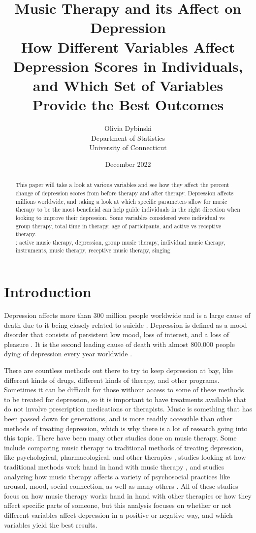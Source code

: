 \documentclass[12pt, titlepage]{article}
\title{Music Therapy and its Affect on Depression \\[1ex] \large How Different Variables Affect Depression Scores in Individuals, and Which Set of Variables Provide the Best Outcomes}
\author{Olivia Dybinski\\
  Department of Statistics\\
  University of Connecticut}
\date{December 2022}
\begin{document}
  \newpage
  \maketitle

 \begin{abstract}
 \label{sec:abstract}

 This paper will take a look at various variables and see how they affect the percent change of depression scores from before therapy and after therapy. Depression affects millions worldwide, and taking a look at which specific parameters allow for music therapy to be the most beneficial can help guide individuals in the right direction when looking to improve their depression. Some variables considered were individual vs group therapy, total time in therapy, age of participants, and active vs receptive therapy. \\
 
 :
 active music therapy, depression, group music therapy, individual music therapy, instruments, music therapy, receptive music therapy, singing

\end{abstract}

 \section{Introduction} 
 \label{sec:introduction}

 Depression affects more than 300 million people worldwide and is a large cause of death due to it being closely related to suicide \citet{PLOS}. Depression is defined as a mood disorder that consists of persistent low mood, loss of interest, and a loss of pleasure \citet{Cochrane}. It is the second leading cause of death with almost 800,000 people dying of depression every year worldwide \citet{PLOS}. 

 There are countless methods out there to try to keep depression at bay, like different kinds of drugs, different kinds of therapy, and other programs. Sometimes it can be difficult for those without access to some of these methods to be treated for depression, so it is important to have treatments available that do not involve prescription medications or therapists. Music is something that has been passed down for generations, and is more readily accessible than other methods of treating depression, which is why there is a lot of research going into this topic. There have been many other studies done on music therapy. Some include comparing music therapy to traditional methods of treating depression, like psychological, pharmacological, and other therapies \citet{Cochrane}, studies looking at how traditional methods work hand in hand with music therapy \citet{British}, and studies analyzing how music therapy affects a variety of psychosocial practices like arousal, mood, social connection, as well as many others \citet{Frontiers}. All of these studies focus on how music therapy works hand in hand with other therapies or how they affect specific parts of someone, but this analysis focuses on whether or not different variables affect depression in a positive or negative way, and which variables yield the best results. 
\end{document}
